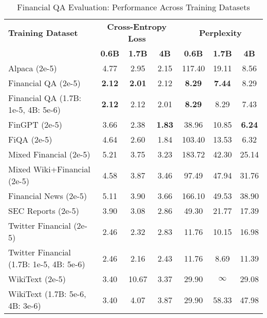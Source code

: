 
\begin{table}[htbp]
\centering
\caption[Financial QA Evaluation: Cross-Dataset Performance]{Financial QA Evaluation: Performance Across Training Datasets}
\label{tab:cross_financial_qa}
\begin{tabular}{l|ccc|ccc}
\hline
\textbf{Training Dataset} & \multicolumn{3}{c|}{\textbf{Cross-Entropy Loss}} & \multicolumn{3}{c}{\textbf{Perplexity}} \\
\cline{2-4} \cline{5-7}
  & \textbf{0.6B} & \textbf{1.7B} & \textbf{4B} & \textbf{0.6B} & \textbf{1.7B} & \textbf{4B} \\
Alpaca (2e-5) & 4.77 & 2.95 & 2.15 & 117.40 & 19.11 & 8.56  \\
Financial QA (2e-5) & \textbf{2.12} & \textbf{2.01} & 2.12 & \textbf{8.29} & \textbf{7.44} & 8.29  \\
Financial QA (1.7B: 1e-5, 4B: 5e-6) & \textbf{2.12} & 2.12 & 2.01 & \textbf{8.29} & 8.29 & 7.43  \\
FinGPT (2e-5) & 3.66 & 2.38 & \textbf{1.83} & 38.96 & 10.85 & \textbf{6.24}  \\
FiQA (2e-5) & 4.64 & 2.60 & 1.84 & 103.40 & 13.53 & 6.32  \\
Mixed Financial (2e-5) & 5.21 & 3.75 & 3.23 & 183.72 & 42.30 & 25.14  \\
Mixed Wiki+Financial (2e-5) & 4.58 & 3.87 & 3.46 & 97.49 & 47.94 & 31.76  \\
Financial News (2e-5) & 5.11 & 3.90 & 3.66 & 166.10 & 49.53 & 38.90  \\
SEC Reports (2e-5) & 3.90 & 3.08 & 2.86 & 49.30 & 21.77 & 17.39  \\
Twitter Financial (2e-5) & 2.46 & 2.32 & 2.83 & 11.76 & 10.15 & 16.98  \\
Twitter Financial (1.7B: 1e-5, 4B: 5e-6) & 2.46 & 2.16 & 2.43 & 11.76 & 8.69 & 11.39  \\
WikiText (2e-5) & 3.40 & 10.67 & 3.37 & 29.90 & $\infty$ & 29.08  \\
WikiText (1.7B: 5e-6, 4B: 3e-6) & 3.40 & 4.07 & 3.87 & 29.90 & 58.33 & 47.98  \\
\hline
\end{tabular}
\end{table}

